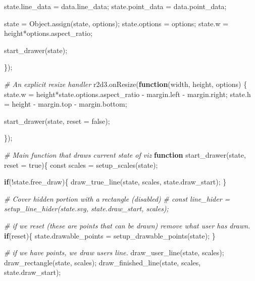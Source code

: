 \documentclass[print]{nuthesis}
\newenvironment{Shaded}{\begin{snugshade}}{\end{snugshade}}
\newcommand{\AttributeTok}[1]{\textcolor[rgb]{0.77,0.63,0.00}{#1}}
\newcommand{\CommentTok}[1]{\textcolor[rgb]{0.56,0.35,0.01}{\textit{#1}}}
\newcommand{\ControlFlowTok}[1]{\textcolor[rgb]{0.13,0.29,0.53}{\textbf{#1}}}
\newcommand{\FunctionTok}[1]{\textcolor[rgb]{0.00,0.00,0.00}{#1}}
\newcommand{\NormalTok}[1]{#1}
\newcommand{\OtherTok}[1]{\textcolor[rgb]{0.56,0.35,0.01}{#1}}
\newcommand{\SpecialCharTok}[1]{\textcolor[rgb]{0.00,0.00,0.00}{#1}}
\begin{document}
\begin{Shaded}
\begin{Highlighting}[]
\NormalTok{  state.line\_data }\OtherTok{=}\NormalTok{ data.line\_data;}
\NormalTok{  state.point\_data }\OtherTok{=}\NormalTok{ data.point\_data;}
  
\NormalTok{  state }\OtherTok{=} \FunctionTok{Object.assign}\NormalTok{(state, options);}
\NormalTok{  state.options }\OtherTok{=}\NormalTok{ options;}
\NormalTok{  state.w }\OtherTok{=}\NormalTok{ height}\SpecialCharTok{*}\NormalTok{options.aspect\_ratio;}

  \FunctionTok{start\_drawer}\NormalTok{(state);}

\NormalTok{\});}

\CommentTok{\# An explicit resize handler}
\FunctionTok{r2d3.onResize}\NormalTok{(}\ControlFlowTok{function}\NormalTok{(width, height, options) \{}
\NormalTok{  state.w }\OtherTok{=}\NormalTok{ height}\SpecialCharTok{*}\NormalTok{state.options.aspect\_ratio }\SpecialCharTok{{-}}\NormalTok{ margin.left }\SpecialCharTok{{-}}\NormalTok{ margin.right;}
\NormalTok{  state.h }\OtherTok{=}\NormalTok{ height }\SpecialCharTok{{-}}\NormalTok{ margin.top }\SpecialCharTok{{-}}\NormalTok{ margin.bottom;}
  
  \FunctionTok{start\_drawer}\NormalTok{(state, }\AttributeTok{reset =}\NormalTok{ false);}

\NormalTok{\});}

\CommentTok{\# Main function that draws current state of viz}
\ControlFlowTok{function} \FunctionTok{start\_drawer}\NormalTok{(state, }\AttributeTok{reset =}\NormalTok{ true)\{}
\NormalTok{  const scales }\OtherTok{=} \FunctionTok{setup\_scales}\NormalTok{(state);}
  
  \ControlFlowTok{if}\NormalTok{(}\SpecialCharTok{!}\NormalTok{state.free\_draw)\{}
    \FunctionTok{draw\_true\_line}\NormalTok{(state, scales, state.draw\_start);}
\NormalTok{  \}}
  
  \CommentTok{\# Cover hidden portion with a rectangle (disabled)}
  \CommentTok{\# const line\_hider = setup\_line\_hider(state.svg, state.draw\_start, scales);}
  
  \CommentTok{\# if we reset (these are points that can be drawn) remove what user has drawn.}
  \ControlFlowTok{if}\NormalTok{(reset)\{}
\NormalTok{    state.drawable\_points }\OtherTok{=} \FunctionTok{setup\_drawable\_points}\NormalTok{(state);}
\NormalTok{  \}}
  
  \CommentTok{\# if we have points, we draw user\textquotesingle{}s line.}
  \FunctionTok{draw\_user\_line}\NormalTok{(state, scales);}
  \FunctionTok{draw\_rectangle}\NormalTok{(state, scales);}
  \FunctionTok{draw\_finished\_line}\NormalTok{(state, scales, state.draw\_start);}
  

\end{Highlighting}
\end{Shaded}
\end{document}
